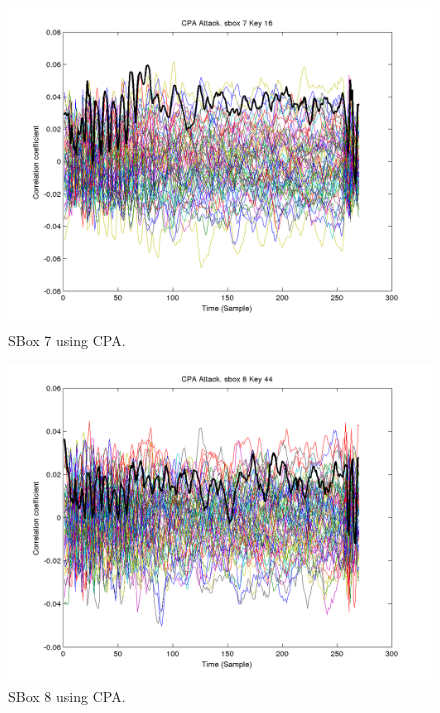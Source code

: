   \begin{figure}[]
  \includegraphics[width=0.9\linewidth]{./cpa7}
  \caption{SBox 7 using CPA.}
  \label{fig:cpa7}
  \end{figure}

  \begin{figure}[]
  \includegraphics[width=0.9\linewidth]{./cpa8}
  \caption{SBox 8 using CPA.}
  \label{fig:cpa8}
  \end{figure}	








